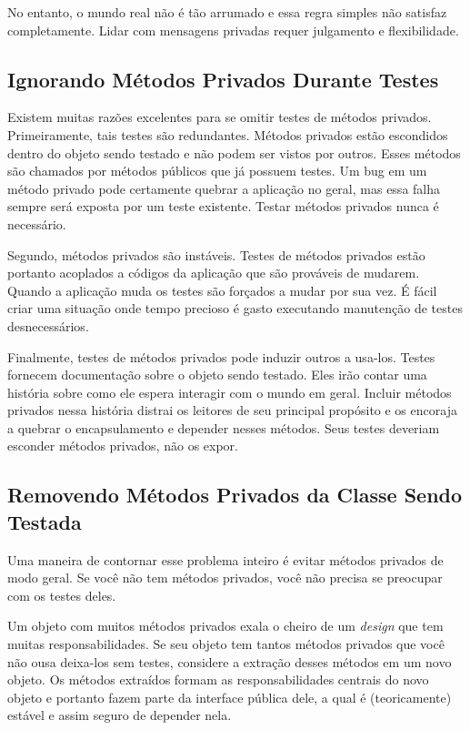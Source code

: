 No entanto, o mundo real não é tão arrumado e essa regra simples não satisfaz
completamente. Lidar com mensagens privadas requer julgamento e flexibilidade.

\subsection{ Ignorando Métodos Privados Durante Testes }

Existem muitas razões excelentes para se omitir testes de métodos privados.
Primeiramente, tais testes são redundantes. Métodos privados estão escondidos
dentro do objeto sendo testado e não podem ser vistos por outros. Esses métodos
são chamados por métodos públicos que já possuem testes. Um bug em um método
privado pode certamente quebrar a aplicação no geral, mas essa falha sempre será
exposta por um teste existente. Testar métodos privados nunca é necessário.

Segundo, métodos privados são instáveis. Testes de métodos privados estão
portanto acoplados a códigos da aplicação que são prováveis de mudarem. Quando a
aplicação muda os testes são forçados a mudar por sua vez. É fácil criar uma
situação onde tempo precioso é gasto executando manutenção de testes
desnecessários.

Finalmente, testes de métodos privados pode induzir outros a usa-los. Testes
fornecem documentação sobre o objeto sendo testado. Eles irão contar uma
história sobre como ele espera interagir com o mundo em geral. Incluir métodos
privados nessa história distrai os leitores de seu principal propósito e os
encoraja a quebrar o encapsulamento e depender nesses métodos. Seus testes
deveriam esconder métodos privados, não os expor.

\subsection{ Removendo Métodos Privados da Classe Sendo Testada }

Uma maneira de contornar esse problema inteiro é evitar métodos privados de modo
geral. Se você não tem métodos privados, você não precisa se preocupar com os
testes deles.

Um objeto com muitos métodos privados exala o cheiro de um \textit{design} que
tem muitas responsabilidades. Se seu objeto tem tantos métodos privados que você
não ousa deixa-los sem testes, considere a extração desses métodos em um novo
objeto. Os métodos extraídos formam as responsabilidades centrais do novo
objeto e portanto fazem parte da interface pública dele, a qual é
(teoricamente) estável e assim seguro de depender nela.

